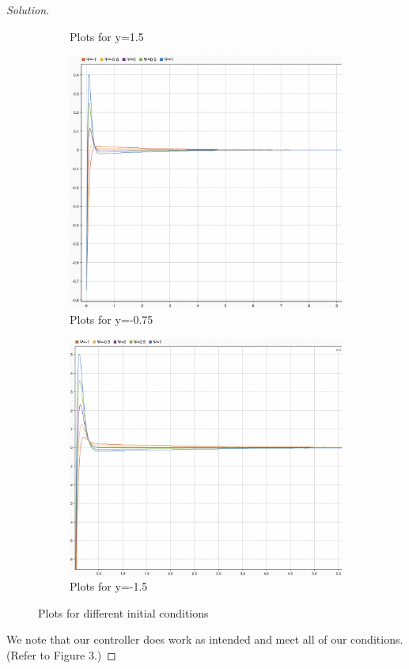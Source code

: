 \documentclass{article}
\begin{document}
\begin{proof}[Solution]
\begin{figure}
\begin{subfigure}{0.4\linewidth}
        \caption{Plots for y=1.5}
      \end{subfigure}
      \begin{subfigure}{0.4\linewidth}
        \includegraphics[width=\linewidth]{img5.png}
        \caption{Plots for y=-0.75}
      \end{subfigure}
      \begin{subfigure}{0.4\linewidth}
          \includegraphics[width=\linewidth]{img6.png}
          \caption{Plots for y=-1.5}
        \end{subfigure}
    \caption{Plots for different initial conditions}

  \end{figure}
We note that our controller does work as intended and meet all of our conditions. (Refer to Figure 3.)
\end{proof}
\newpage
\end{document}
